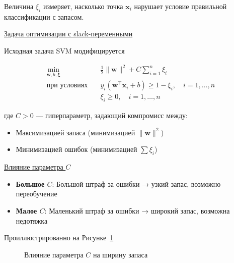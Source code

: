 Величина $\xi_i$ измеряет, насколько точка $\bm{x}_i$ нарушает условие правильной классификации с запасом.

\underline{Задача оптимизации с slack-переменными}

Исходная задача SVM модифицируется

\begin{align*}
    \min_{\bm{w}, b, \bm{\xi}} &\quad \frac{1}{2} \|\bm{w}\|^2 + C \sum_{i=1}^n \xi_i \\
    \text{при условиях} &\quad y_i(\bm{w}^\top \bm{x}_i + b) \geq 1 - \xi_i, \quad i = 1, \dots, n \\
    &\quad \xi_i \geq 0, \quad i = 1, \dots, n
\end{align*}

где $C > 0$ --- гиперпараметр, задающий компромисс между:
\begin{itemize}
    \item Максимизацией запаса (минимизацией $\|\bm{w}\|^2$)
    \item Минимизацией ошибок (минимизацией $\sum \xi_i$)
\end{itemize}

\underline{Влияние параметра $C$}

\begin{itemize}
    \item \textbf{Большое $C$}: Большой штраф за ошибки → узкий запас, возможно переобучение
    \item \textbf{Малое $C$}: Маленький штраф за ошибки → широкий запас, возможна недотяжка
\end{itemize}
Проиллюстрированно на Рисунке~\ref{fig:C}
\begin{figure}[h]
    \centering
    \caption{Влияние параметра $C$ на ширину запаса}
    \label{fig:C}
\end{figure}

